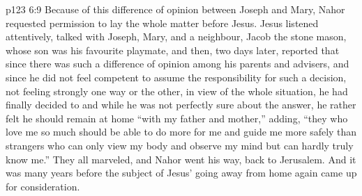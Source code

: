 \vs p123 6:9 Because of this difference of opinion between Joseph and Mary, Nahor requested permission to lay the whole matter before Jesus. Jesus listened attentively, talked with Joseph, Mary, and a neighbour, Jacob the stone mason, whose son was his favourite playmate, and then, two days later, reported that since there was such a difference of opinion among his parents and advisers, and since he did not feel competent to assume the responsibility for such a decision, not feeling strongly one way or the other, in view of the whole situation, he had finally decided to  and while he was not perfectly sure about the answer, he rather felt he should remain at home “with my father and mother,” adding, “they who love me so much should be able to do more for me and guide me more safely than strangers who can only view my body and observe my mind but can hardly truly know me.” They all marveled, and Nahor went his way, back to Jerusalem. And it was many years before the subject of Jesus’ going away from home again came up for consideration.
